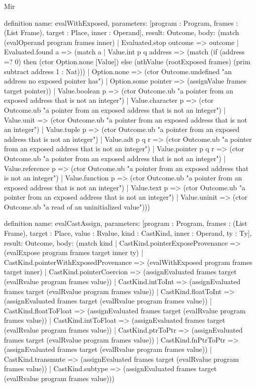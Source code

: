 \begin{lexlean}{Mir}
\begin{semanticmodule}
definition{
  name: evalWithExposed,
  parameters: [program : Program, frames : (List Frame), target : Place, inner : Operand],
  result: Outcome,
  body: (match (evalOperand program frames inner)
    | Evaluated.stop outcome => outcome
    | Evaluated.found a => (match a
      | Value.int p q address => (match (if (address =? 0) then (ctor Option.none [Value]) else (nthValue (rootExposed frames) (prim subtract address 1 : Nat)))
        | Option.none => (ctor Outcome.undefined "an address no exposed pointer has")
        | Option.some pointer => (assignValue frames target pointer))
      | Value.boolean p => (ctor Outcome.ub "a pointer from an exposed address that is not an integer")
      | Value.character p => (ctor Outcome.ub "a pointer from an exposed address that is not an integer")
      | Value.unit => (ctor Outcome.ub "a pointer from an exposed address that is not an integer")
      | Value.tuple p => (ctor Outcome.ub "a pointer from an exposed address that is not an integer")
      | Value.adt p q r => (ctor Outcome.ub "a pointer from an exposed address that is not an integer")
      | Value.pointer p q r => (ctor Outcome.ub "a pointer from an exposed address that is not an integer")
      | Value.reference p => (ctor Outcome.ub "a pointer from an exposed address that is not an integer")
      | Value.function p => (ctor Outcome.ub "a pointer from an exposed address that is not an integer")
      | Value.text p => (ctor Outcome.ub "a pointer from an exposed address that is not an integer")
      | Value.uninit => (ctor Outcome.ub "a read of an uninitialized value")))
}

definition{
  name: evalCastAssign,
  parameters: [program : Program, frames : (List Frame), target : Place, value : Rvalue, kind : CastKind, inner : Operand, ty : Ty],
  result: Outcome,
  body: (match kind
    | CastKind.pointerExposeProvenance => (evalExpose program frames target inner ty)
    | CastKind.pointerWithExposedProvenance => (evalWithExposed program frames target inner)
    | CastKind.pointerCoercion => (assignEvaluated frames target (evalRvalue program frames value))
    | CastKind.intToInt => (assignEvaluated frames target (evalRvalue program frames value))
    | CastKind.floatToInt => (assignEvaluated frames target (evalRvalue program frames value))
    | CastKind.floatToFloat => (assignEvaluated frames target (evalRvalue program frames value))
    | CastKind.intToFloat => (assignEvaluated frames target (evalRvalue program frames value))
    | CastKind.ptrToPtr => (assignEvaluated frames target (evalRvalue program frames value))
    | CastKind.fnPtrToPtr => (assignEvaluated frames target (evalRvalue program frames value))
    | CastKind.transmute => (assignEvaluated frames target (evalRvalue program frames value))
    | CastKind.subtype => (assignEvaluated frames target (evalRvalue program frames value)))
}


\end{semanticmodule}
\end{lexlean}
